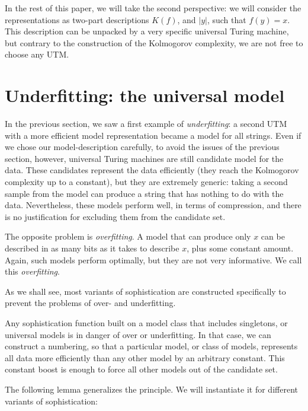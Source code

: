 \documentclass{style/llncs}
\begin{document}
In the rest of this paper, we will take the second perspective: we will consider the representations as two-part descriptions $K(f)$, and $|y|$, such that $f(y)=x$. This description can be unpacked by a very specific universal Turing machine, but contrary to the construction of the Kolmogorov complexity, we are not free to choose any UTM.

\section{Underfitting: the universal model}

In the previous section, we saw a first example of \emph{underfitting}: a second UTM with a more efficient model representation became a model for all strings. Even if we chose our model-description carefully, to avoid the issues of the previous section, however, universal Turing machines are still candidate model for the data. These candidates represent the data efficiently (they reach the Kolmogorov complexity up to a constant), but they are extremely generic: taking a second sample from the model can produce a string that has nothing to do with the data. Nevertheless, these models perform well, in terms of compression, and there is no justification for excluding them from the candidate set.

The opposite problem is \emph{overfitting}. A model that can produce only $x$ can be described in as many bits as it takes to describe $x$, plus some constant amount. Again, such models perform optimally, but they are not very informative. We call this \emph{overfitting}.

As we shall see, most variants of sophistication are constructed specifically to prevent the problems of over- and underfitting.

Any sophistication function built on a model class that includes singletons, or universal models is in danger of over or underfitting. In that case, we can construct a numbering, so that a particular model, or class of models, represents all data more efficiently than any other model by an arbitrary constant. This constant boost is enough to force all other models out of the candidate set. 

The following lemma generalizes the principle. We will instantiate it for different variants of sophistication: 
\end{document}
